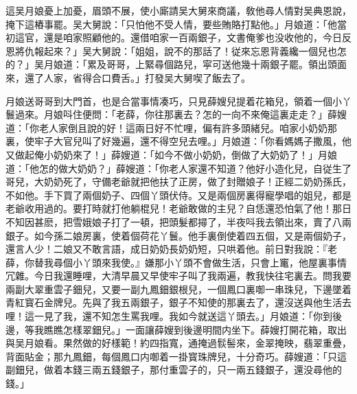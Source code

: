 這吴月娘憂上加憂，眉頭不展，使小廝請吴大舅來商議，敎他尋人情對吴典恩說，掩下這樁事罷。吴大舅說：「只怕他不受人情，要些賄賂打點他。」月娘道：「他當初這官，還是咱家照顧他的。還借咱家一百兩銀子，文書俺爹也没收他的，今日反恩將仇報起來？」吴大舅說：「姐姐，說不的那話了！従來忘恩背義纔一個兒也怎的？」吴月娘道：「累及哥哥，上緊尋個路兒，寜可送他幾十兩銀子罷。領出頭面來，還了人家，省得合口費舌。」打發吴大舅喫了飯去了。

月娘送哥哥到大門首，也是合當事情凑巧，只見薛嫂兒提着花箱兒，領着一個小丫鬟過來。月娘呌住便問：「老薛，你往那裏去？怎的一向不來俺這裏走走？」薛嫂道：「你老人家倒且說的好！這兩日好不忙哩，偏有許多頭緒兒。咱家小奶奶那裏，使牢子大官兒叫了好幾遍，還不得空兒去哩。」月娘道：「你看媽媽子撒風，他又做起俺小奶奶來了！」薛嫂道：「如今不做小奶奶，倒做了大奶奶了！」月娘道：「他怎的做大奶奶？」薛嫂道：「你老人家還不知道？他好小造化兒，自従生了哥兒，大奶奶死了，守備老爺就把他扶了正房，做了封贈娘子！正經二奶奶孫氏，不如他。手下買了兩個奶子、四個丫頭伏侍。又是兩個房裏得寵學唱的姐兒，都是老爺收用過的。要打時就打他躺棍兒！老爺敢做的主兒？自恁還恐怕氣了他！那日不知因甚麽，把雪娥娘子打了一頓，把頭髮都撏了，半夜呌我去領出來，賣了八兩銀子。如今孫二娘房裏，使着個荷花丫鬟。他手裏倒使着四五個，又是兩個奶子，還言人少！二娘又不敢言語，成日奶奶長奶奶短，只哄着他。前日對我說：『老薛，你替我尋個小丫頭來我使。』嫌那小丫頭不會做生活，只會上竃，他屋裏事情冗雜。今日我還睡哩，大清早晨又早使牢子叫了我兩遍，教我快往宅裏去。問我要兩副大翠重雲子鈿兒，又要一副九鳳鈿銀根兒，一個鳳口裏啣一串珠兒，下邊墜着青紅寳石金牌兒。先與了我五兩銀子，銀子不知使的那裏去了，還沒送與他生活去哩！這一見了我，還不知怎生罵我哩。我如今就送這丫頭去。」月娘道：「你到後邊，等我瞧瞧怎樣翠鈿兒。」一面讓薛嫂到後邊明間内坐下。薛嫂打開花箱，取出與吴月娘看。果然做的好樣範！約四指寬，通掩過䯼髻來，金翠掩映，翡翠重疊，背面貼金；那九鳳鈿，每個鳳口内啣着一掛寳珠牌兒，十分奇巧。薛嫂道：「只這副鈿兒，做着本錢三兩五錢銀子，那付重雲子的，只一兩五錢銀子，還没尋他的錢。」


